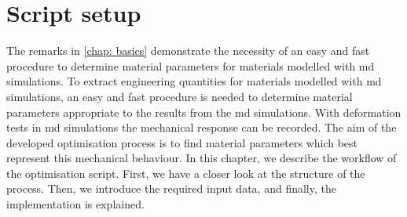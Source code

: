 




\chapter{Script setup} \label{chap:modelsAndMethods}

The remarks in \autoref{chap: basics} demonstrate the necessity of an easy and fast procedure to determine material parameters for materials modelled with \acrshort{md} simulations. 
To extract engineering quantities for materials modelled with \acrshort{md} simulations, an easy and fast procedure is needed to determine material parameters appropriate to the results from the \acrshort{md} simulations.
With deformation tests in \acrshort{md} simulations the mechanical response can be recorded. The aim of the developed optimisation process is to find material parameters which best represent this mechanical behaviour.
In this chapter, we describe the workflow of the optimisation script. First, we have a closer look at the structure of the process. Then, we introduce the required input data, and finally, the implementation is explained. \\

